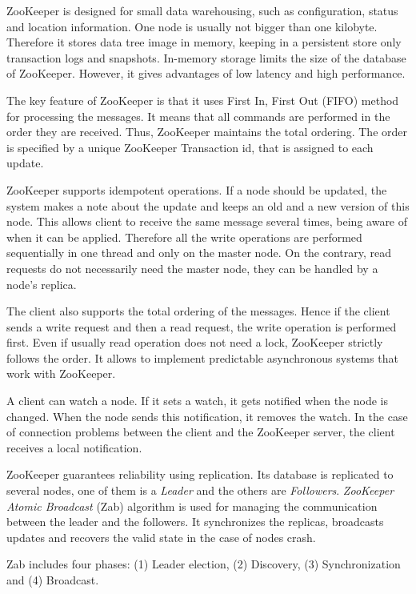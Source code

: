 ZooKeeper is designed for small data warehousing, such as configuration, status and location information.
One node is usually not bigger than one kilobyte.
Therefore it stores data tree image in memory, keeping in a persistent store only transaction logs and snapshots.
In-memory storage limits the size of the database of ZooKeeper.
However, it gives advantages of low latency and high performance. 

The key feature of ZooKeeper is that it uses First In, First Out (FIFO) method for processing the messages.
It means that all commands are performed in the order they are received.
Thus, ZooKeeper maintains the total ordering.
The order is specified by a unique ZooKeeper Transaction id, that is assigned to each update.
 
ZooKeeper supports idempotent operations.
If a node should be updated, the system makes a note about the update and keeps an old and a new version of this node.
This allows client to receive the same message several times, being aware of when it can be applied.
Therefore all the write operations are performed sequentially in one thread and only on the master node.
On the contrary, read requests do not necessarily need the master node, they can be handled by a node's replica.

The client also supports the total ordering of the messages.
Hence if the client sends a write request and then a read request, the write operation is performed first.
Even if usually read operation does not need a lock, ZooKeeper strictly follows the order.
It allows to implement predictable asynchronous systems that work with ZooKeeper.

A client can watch a node.
If it sets a watch, it gets notified when the node is changed.
When the node sends this notification, it removes the watch.
In the case of connection problems between the client and the ZooKeeper server, the client receives a local notification.

ZooKeeper guarantees reliability using replication.
Its database is replicated to several nodes, one of them is a \textit{Leader} and the others are \textit{Followers}.
\textit{ZooKeeper Atomic Broadcast} (Zab) algorithm is used for managing the communication between the leader and the followers.
It synchronizes the replicas, broadcasts updates and recovers the valid state in the case of nodes crash.

Zab includes four phases: (1) Leader election, (2) Discovery, (3) Synchronization and (4) Broadcast.

